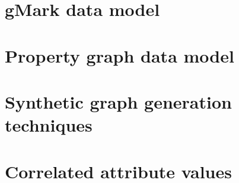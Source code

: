 \documentclass[a4paper,10pt,twoside]{report}
\begin{document}
%
%

\chapter{gMark data model}\label{chapter:gmark_definition}


\chapter{Property graph data model}\label{chapter:property_definition}


\chapter{Synthetic graph generation techniques}\label{chapter:graphgen_tech}


\chapter{Correlated attribute values}\label{chapter:correlated_attributes}


%

%





%
\end{document}
